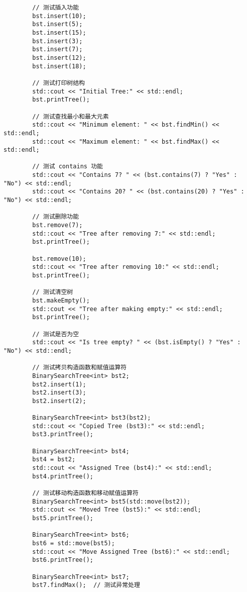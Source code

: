 \documentclass[UTF8]{ctexart}
\begin{document}
\begin{verbatim}
        // 测试插入功能
        bst.insert(10);
        bst.insert(5);
        bst.insert(15);
        bst.insert(3);
        bst.insert(7);
        bst.insert(12);
        bst.insert(18);

        // 测试打印树结构
        std::cout << "Initial Tree:" << std::endl;
        bst.printTree();

        // 测试查找最小和最大元素
        std::cout << "Minimum element: " << bst.findMin() << std::endl;
        std::cout << "Maximum element: " << bst.findMax() << std::endl;

        // 测试 contains 功能
        std::cout << "Contains 7? " << (bst.contains(7) ? "Yes" : "No") << std::endl;
        std::cout << "Contains 20? " << (bst.contains(20) ? "Yes" : "No") << std::endl;

        // 测试删除功能
        bst.remove(7);
        std::cout << "Tree after removing 7:" << std::endl;
        bst.printTree();

        bst.remove(10);
        std::cout << "Tree after removing 10:" << std::endl;
        bst.printTree();

        // 测试清空树
        bst.makeEmpty();
        std::cout << "Tree after making empty:" << std::endl;
        bst.printTree();

        // 测试是否为空
        std::cout << "Is tree empty? " << (bst.isEmpty() ? "Yes" : "No") << std::endl;

        // 测试拷贝构造函数和赋值运算符
        BinarySearchTree<int> bst2;
        bst2.insert(1);
        bst2.insert(3);
        bst2.insert(2);

        BinarySearchTree<int> bst3(bst2);
        std::cout << "Copied Tree (bst3):" << std::endl;
        bst3.printTree();

        BinarySearchTree<int> bst4;
        bst4 = bst2;
        std::cout << "Assigned Tree (bst4):" << std::endl;
        bst4.printTree();

        // 测试移动构造函数和移动赋值运算符
        BinarySearchTree<int> bst5(std::move(bst2));
        std::cout << "Moved Tree (bst5):" << std::endl;
        bst5.printTree();

        BinarySearchTree<int> bst6;
        bst6 = std::move(bst5);
        std::cout << "Move Assigned Tree (bst6):" << std::endl;
        bst6.printTree();

        BinarySearchTree<int> bst7;
        bst7.findMax();  // 测试异常处理
\end{verbatim}
\end{document}
